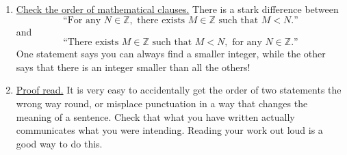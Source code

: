\documentclass[12pt,a4paper]{article}
\newcommand{\Z}{\mathbb{Z}}
\begin{document}
\begin{enumerate}
    \item \underline{Check the order of mathematical clauses.} There is a stark difference between
    \[
    \text{``For any }N\in\Z,\text{ there exists }M\in\Z\text{ such that }M<N.\text{''}
    \]
    and
    \[
    \text{``There exists }M\in\Z\text{ such that }M<N, \text{ for any }N\in\Z.\text{''}
    \]
    One statement says you can always find a smaller integer, while the other says that there is an integer smaller than all the others!

    \item \underline{Proof read.} It is very easy to accidentally get the order of two statements the wrong way round, or misplace punctuation in a way that changes the meaning of a sentence. Check that what you have written actually communicates what you were intending. Reading your work out loud is a good way to do this.
\end{enumerate}
    
\end{document}
